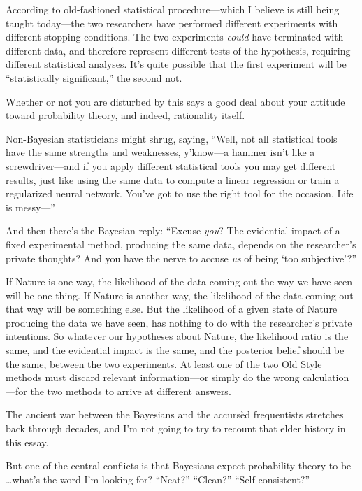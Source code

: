 {
 According to old-fashioned statistical procedure---which I believe
is still being taught today---the two researchers have performed
different experiments with different stopping conditions. The two
experiments \textit{could} have terminated with different data, and
therefore represent different tests of the hypothesis, requiring
different statistical analyses. It's quite possible
that the first experiment will be ``statistically
significant,'' the second not.}

{
 Whether or not you are disturbed by this says a good deal about
your attitude toward probability theory, and indeed, rationality
itself.}

{
 Non-Bayesian statisticians might shrug, saying,
``Well, not all statistical tools have the same
strengths and weaknesses, y'know---a hammer
isn't like a screwdriver---and if you apply different
statistical tools you may get different results, just like using the
same data to compute a linear regression or train a regularized neural
network. You've got to use the right tool for the
occasion. Life is messy---''}

{
 And then there's the Bayesian reply:
``Excuse \textit{you}? The evidential impact of a
fixed experimental method, producing the same data, depends on the
researcher's private thoughts? And you have the nerve
to accuse \textit{us} of being `too
subjective'?''}

{
 If Nature is one way, the likelihood of the data coming out the
way we have seen will be one thing. If Nature is another way, the
likelihood of the data coming out that way will be something else. But
the likelihood of a given state of Nature producing the data we have
seen, has nothing to do with the researcher's private
intentions. So whatever our hypotheses about Nature, the likelihood
ratio is the same, and the evidential impact is the same, and the
posterior belief should be the same, between the two experiments. At
least one of the two Old Style methods must discard relevant
information---or simply do the wrong calculation---for the two methods
to arrive at different answers.}

{
 The ancient war between the Bayesians and the accursèd
frequentists stretches back through decades, and I'm
not going to try to recount that elder history in this essay.}

{
 But one of the central conflicts is that Bayesians expect
probability theory to be \ldots what's the word
I'm looking for?
``Neat?''
``Clean?''
``Self-consistent?''}


